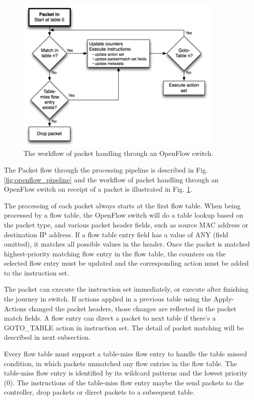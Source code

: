 \begin{figure}[!ht]
\centering
\includegraphics[width=0.9\textwidth]{./fig/openflow_matching}
\caption{The workflow of packet handling through an OpenFlow switch. \cite{openflow-spec}}
\label{fig:openflow_matching}
\end{figure}

The Packet flow through the processing pipeline is described in Fig. \ref{fig:openflow_pipeline} and the workflow of packet handling through an OpenFlow switch on receipt of a packet is illustrated in Fig. \ref{fig:openflow_matching}.

The processing of each packet always starts at the first flow table.
When being processed by a flow table, the OpenFlow switch will do a table lookup based on the packet type, and various packet header fields, such as source MAC address or destination IP address.
If a flow table entry field has a value of ANY (field omitted), it matches all possible values in the header.
Once the packet is matched highest-priority matching flow entry in the flow table, the counters on the selected flow entry must be updated and the corresponding action must be added to the instruction set.

The packet can execute the instruction set immediately, or execute after finishing the journey in switch.
If actions applied in a previous table using the Apply-Actions changed the packet headers, those changes are reflected in the packet match fields.
A flow entry can direct a packet to next table if there's a GOTO\_TABLE action in instruction set.
The detail of packet matching will be described in next subsection.

Every flow table must support a table-miss flow entry to handle the table missed condition, in which packets unmatched any flow entries in the flow table. The table-miss flow entry is identified by its wildcard patterns and the lowest priority (0). The instructions of the table-miss flow entry maybe the send packets to the controller, drop packets or direct packets to a subsequent table.





